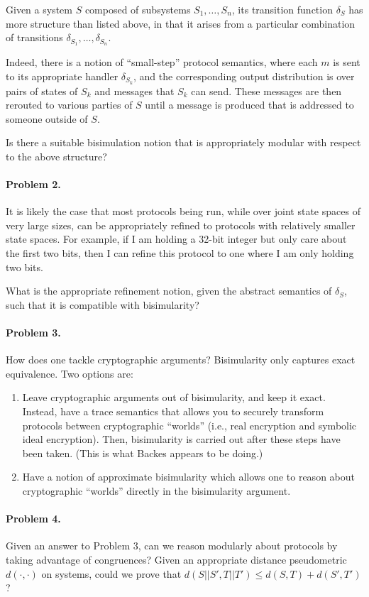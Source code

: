 \documentclass{article}
\begin{document}
Given a system $S$ composed of subsystems $S_1, \dots, S_n$, its transition function $\delta_S$ has more structure than listed above, in that it arises from a particular combination of transitions $\delta_{S_1}, \dots, \delta_{S_n}$. 

Indeed, there is a notion of ``small-step'' protocol semantics, where each $m$ is sent to its appropriate handler $\delta_{S_k}$, and the corresponding output distribution is over pairs of states of $S_k$ and messages that $S_k$ can send. These messages are then rerouted to various parties of $S$ until a message is produced that is addressed to someone outside of $S$.

Is there a suitable bisimulation notion that is appropriately modular with respect to the above structure?

\paragraph{Problem 2.}

It is likely the case that most protocols being run, while over joint state spaces of very large sizes, can be appropriately refined to protocols with relatively smaller state spaces. For example, if I am holding a 32-bit integer but only care about the first two bits, then I can refine this protocol to one where I am only holding two bits. 

What is the appropriate refinement notion, given the abstract semantics of $\delta_S$, such that it is compatible with bisimularity?

\paragraph{Problem 3.}

How does one tackle cryptographic arguments? Bisimularity only captures exact equivalence. Two options are:
\begin{enumerate}
    \item Leave cryptographic arguments out of bisimularity, and keep it exact. Instead, have a trace semantics that allows you to securely transform protocols between cryptographic ``worlds'' (i.e., real encryption and symbolic ideal encryption). Then, bisimularity is carried out after these steps have been taken. (This is what Backes appears to be doing.)
    \item Have a notion of approximate bisimularity which allows one to reason about cryptographic ``worlds'' directly in the bisimularity argument.
\end{enumerate}

\paragraph{Problem 4.}

Given an answer to Problem 3, can we reason modularly about protocols by taking advantage of congruences? Given an appropriate distance pseudometric $d(\cdot, \cdot)$ on systems, could we prove that $d(S || S', T || T') \leq d(S,T) + d(S', T')$?
\end{document}
